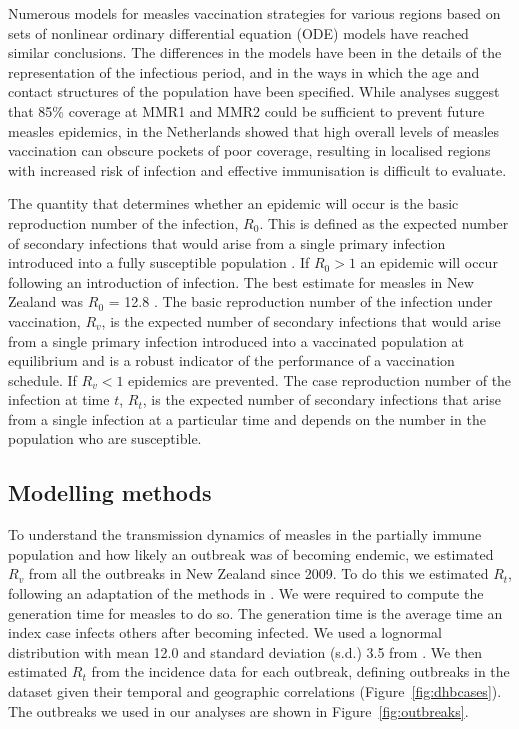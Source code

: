 \documentclass{article}
\begin{document}
\begin{itemize}
Numerous models for measles vaccination strategies for various regions \citep{agur93, babad95, edmunds0, gay98, wallinga1} based on sets of nonlinear ordinary differential equation (ODE) models have reached similar conclusions. The differences in the models have been in the details of the representation of the infectious period, and in the ways in which the age and contact structures of the population have been specified. While analyses suggest that 85\% coverage at MMR1 and MMR2 could be sufficient to prevent future measles epidemics, \citep{glass4} in the Netherlands showed that high overall levels of measles vaccination can obscure pockets of poor coverage, resulting in localised regions with increased risk of infection and effective immunisation is difficult to evaluate. 

The quantity that determines whether an epidemic will occur is the basic reproduction number of the infection, $R_0$. This is defined as the expected number of secondary infections that would arise from a single primary infection introduced into a fully susceptible population \citep{anderson91, diekmann0}. If $R_0 > 1$ an epidemic will occur following an introduction of infection. The best estimate for measles in New Zealand was $R_0$ = 12.8 \citep{roberts4}. The basic reproduction number of the infection under vaccination, $R_v$, is the expected number of secondary infections that would arise from a single primary infection introduced into a vaccinated population at equilibrium and is a robust indicator of the performance of a vaccination schedule. If $R_v < 1$ epidemics are prevented. The case reproduction number of the infection at time $t$, $R_t$, is the expected number of secondary infections that arise from a single infection at a particular time and depends on the number in the population who are susceptible.

\subsection{Modelling methods}

To understand the transmission dynamics of measles in the partially immune population and how likely an outbreak was of becoming endemic, we estimated $R_v$ from all the outbreaks in New Zealand since 2009. To do this we estimated $R_t$, following an adaptation of the methods in \citep{obidia12,wallinga4}. We were required to compute the generation time for measles to do so. The generation time is the average time an index case infects others after becoming infected. We used a lognormal distribution with mean 12.0 and standard deviation (s.d.) 3.5 from \citep{klinkenberg11}. We then estimated $R_t$ from the incidence data for each outbreak, defining outbreaks in the dataset given their temporal and geographic correlations (Figure~\ref{fig:dhbcases}). The outbreaks we used in our analyses are shown in Figure~\ref{fig:outbreaks}.


\end{itemize}
\end{document}
